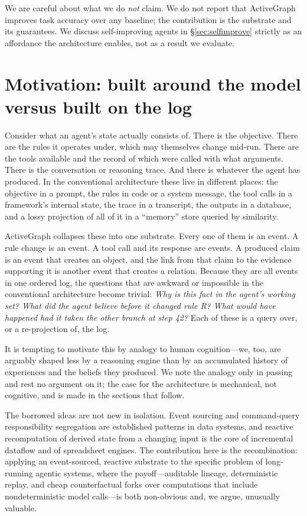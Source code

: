 \documentclass[11pt]{article}
\begin{document}
We are careful about what we do \emph{not} claim. We do not report that
ActiveGraph improves task accuracy over any baseline; the contribution is the
substrate and its guarantees. We discuss self-improving agents in
\S\ref{sec:selfimprove} strictly as an affordance the architecture enables, not
as a result we evaluate.

\section{Motivation: built around the model versus built on the log}
\label{sec:motivation}

Consider what an agent's state actually consists of. There is the objective. There
are the rules it operates under, which may themselves change mid-run. There are
the tools available and the record of which were called with what arguments. There
is the conversation or reasoning trace. And there is whatever the agent has
produced. In the conventional architecture these live in different places: the
objective in a prompt, the rules in code or a system message, the tool calls in
a framework's internal state, the trace in a transcript, the outputs in a
database, and a lossy projection of all of it in a ``memory'' store queried by
similarity.

ActiveGraph collapses these into one substrate. Every one of them is an event.
A rule change is an event. A tool call and its response are events. A produced
claim is an event that creates an object, and the link from that claim to the
evidence supporting it is another event that creates a relation. Because they are
all events in one ordered log, the questions that are awkward or impossible in the
conventional architecture become trivial: \emph{Why is this fact in the agent's
working set? What did the agent believe before it changed rule R? What would have
happened had it taken the other branch at step 42?} Each of these is a query over,
or a re-projection of, the log.

It is tempting to motivate this by analogy to human cognition---we, too, are
arguably shaped less by a reasoning engine than by an accumulated history of
experiences and the beliefs they produced. We note the analogy only in passing
and rest no argument on it; the case for the architecture is mechanical, not
cognitive, and is made in the sections that follow.

The borrowed ideas are not new in isolation. Event sourcing and
command-query responsibility segregation are established patterns in data
systems, and reactive recomputation of derived state from a changing input is the
core of incremental dataflow and of spreadsheet engines. The contribution here is
the recombination: applying an event-sourced, reactive substrate to the specific
problem of long-running agentic systems, where the payoff---auditable lineage,
deterministic replay, and cheap counterfactual forks over computations that
include nondeterministic model calls---is both non-obvious and, we argue,
unusually valuable.
\end{document}
